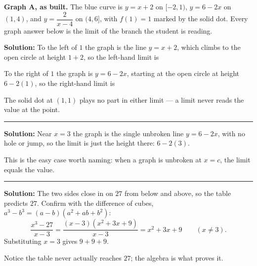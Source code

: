 \documentclass[12pt]{article}
\begin{document}


\textbf{Graph A, as built.} The blue curve is $y = x + 2$ on $[-2, 1)$,
$y = 6 - 2x$ on $(1, 4)$, and $y = \dfrac{2}{x-4}$ on $(4, 6]$, with
$f(1) = 1$ marked by the solid dot. Every graph answer below is the limit of the
branch the student is reading.

\vspace{0.2cm}


\textbf{Solution:} To the left of $1$ the graph is the line $y = x + 2$, which
climbs to the open circle at height $1 + 2$, so the left-hand limit is

To the right of $1$ the graph is $y = 6 - 2x$, starting at the open circle at
height $6 - 2(1)$, so the right-hand limit is 

The solid dot at $(1,1)$ plays no part in either limit --- a limit never reads
the value at the point.

\vspace{0.2cm}\noindent\rule{\linewidth}{0.2pt}\vspace{0.2cm}


\textbf{Solution:} Near $x = 3$ the graph is the single unbroken line
$y = 6 - 2x$, with no hole or jump, so the limit is just the height there:
$6 - 2(3)$. 

This is the easy case worth naming: when a graph is unbroken at $x = c$, the
limit equals the value.

\vspace{0.2cm}\noindent\rule{\linewidth}{0.2pt}\vspace{0.2cm}


\textbf{Solution:} The two sides close in on $27$ from below and above, so the
table predicts $27$. Confirm with the difference of cubes,
$a^3 - b^3 = (a-b)(a^2+ab+b^2)$:
\[
  \frac{x^3-27}{x-3} = \frac{(x-3)\left(x^2+3x+9\right)}{x-3} = x^2+3x+9
  \qquad (x \neq 3).
\]
Substituting $x = 3$ gives $9 + 9 + 9$. 

Notice the table never actually reaches $27$; the algebra is what proves it.
\end{document}
